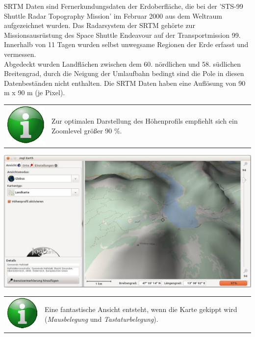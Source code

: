 \documentclass[10pt]{scrreprt}
\newcommand{\textref}[1]{\mbox{\raisebox{0.1ex}{\small$\rightarrow$ }\textit{#1}}}
\begin{document}
SRTM Daten sind Fernerkundungsdaten der Erdoberfläche, die bei der 'STS-99 Shuttle Radar Topography Mission' im Februar 2000 aus dem Weltraum aufgezeichnet wurden. Das Radarsystem der SRTM gehörte zur Missionsausrüstung des Space Shuttle Endeavour auf der Transportmission 99. Innerhalb von 11 Tagen wurden selbst unwegsame Regionen der Erde erfasst und vermessen.\\

Abgedeckt wurden Landflächen zwischen dem 60. nördlichen und 58. südlichen Breitengrad, durch die Neigung der Umlaufbahn bedingt sind die Pole in diesen Datenbeständen nicht enthalten. Die SRTM Daten haben eine Auflösung von 90 m x 90 m (je Pixel).

\vspace{3mm}
\begin{tabular}{>{\centering \arraybackslash}m{1cm} m{14cm}}
\includegraphics[scale=0.5]{images/info.eps} &  Zur optimalen Darstellung des Höhenprofils empfiehlt sich ein Zoomlevel größer 90 \%. \\ 
\end{tabular} 

\vspace{3mm}
\begin{center}
\includegraphics[scale=0.25]{images/heightmap1.jpg}
\end{center}


\vspace{3mm}
\begin{tabular}{>{\centering \arraybackslash}m{1cm} m{14cm}}
\includegraphics[scale=0.5]{images/info.eps} &  Eine fantastische Ansicht entsteht, wenn die Karte gekippt wird (\textref{Mausbelegung} und \textref{Tastaturbelegung}). \\ 
\end{tabular} 
\end{document}

